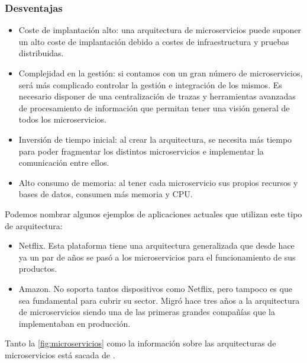 \subsubsection{Desventajas}
\begin{itemize}
	\item Coste de implantación alto: una arquitectura de microservicios puede suponer un alto coste de implantación debido a costes de infraestructura y pruebas distribuidas.
	\item Complejidad en la gestión: si contamos con un gran número de microservicios, será más complicado controlar la gestión e integración de los mismos. Es necesario disponer de una centralización de trazas y herramientas avanzadas de procesamiento de información que permitan tener una visión general de todos los microservicios.
	\item Inversión de tiempo inicial: al crear la arquitectura, se necesita más tiempo para poder fragmentar los distintos microservicios e implementar la comunicación entre ellos.
	\item Alto consumo de memoria: al tener cada microservicio sus propios recursos y bases de datos, consumen más memoria y CPU.
\end{itemize}

Podemos nombrar algunos ejemplos de aplicaciones actuales que utilizan este tipo de arquitectura:
\begin{itemize}
	\item Netflix. Esta plataforma tiene una arquitectura generalizada que desde hace ya un par de años se pasó a los microservicios para el funcionamiento de sus productos.
	\item Amazon. No soporta tantos dispositivos como Netflix, pero tampoco es que sea fundamental para cubrir su sector. Migró hace tres años a la arquitectura de microservicios siendo una de las primeras grandes compañías que la implementaban en producción.
\end{itemize}

Tanto la \autoref{fig:microservicios} como la información sobre las arquitecturas de microservicios está sacada de \cite{microservicios}.

